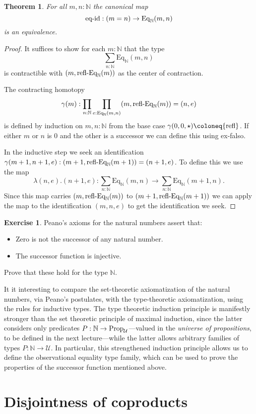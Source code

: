 \documentclass{amsart}
\theoremstyle{theorem}
\newtheorem*{thm}{Theorem}
\theoremstyle{definition}
\newtheorem*{exc}{Exercise}
\theoremstyle{remark}
\newcommand{\0}{\mathbbe{0}}
\newcommand{\1}{\mathbbe{1}}
\newcommand{\2}{\mathbbe{2}}
\newcommand{\3}{\mathbbe{3}}
\newcommand{\4}{\mathbbe{4}}
\newcommand{\term}[1]{{\textup{#1}}}
\newcommand{\type}[1]{{\textup{#1}}}
\newcommand{\bN}{{\mathbb{N}}}
\newcommand{\refl}{\term{refl}}
\newcommand{\UU}{{\mathcal{U}}}
\newcommand{\Eq}{\mathrm{Eq}}
\newcommand{\Prop}{\type{Prop}_{\UU}}
\begin{document}
\begin{thm} For all $m,n : \bN$ the canonical map
\[ \term{eq-id} : (m=n) \to \Eq_\bN(m,n)\] is an equivalence.
\end{thm}
\begin{proof}
It suffices to show for each $m : \bN$ that the type \[ \sum_{n : \bN} \Eq_\bN(m,n)\] is contractible with $(m,\term{refl-Eq}_\bN(m))$ as the center of contraction.

The contracting homotopy
\[ \gamma(m) : \prod_{n :\bN} \prod_{e :\Eq_\bN(m,n)} (m,\term{refl-Eq}_\bN(m)) = (n,e)\]
is defined by induction on $m,n : \bN$ from the base case $\gamma(0,0, \star) \coloneq \refl$. If either $m$ or $n$ is 0 and the other is a successor we can define this using ex-falso.

In the inductive step we seek an identification $\gamma(m+1,n+1,e) : (m+1, \term{refl-Eq}_\bN(m+1)) = (n+1,e)$. To define this we use the map
\[ \lambda(n,e).(n+1,e) : \sum_{n:\bN}\Eq_\bN(m,n) \to \sum_{n : \bN}\Eq_\bN(m+1,n).\]
Since this map carries $(m,\term{refl-Eq}_\bN(m))$ to $(m+1,\term{refl-Eq}_\bN(m+1))$ we can apply the map to the identification $(m,n,e)$ to get the identification we seek.
\end{proof}

\begin{exc} Peano's axioms for the natural numbers assert that:
\begin{itemize}
\item Zero is not the successor of any natural number.
\item The successor function is injective.
\end{itemize}
Prove that these hold for the type $\bN$.
\end{exc}

It it interesting to compare the set-theoretic axiomatization of the natural numbers, via Peano's postulates, with the type-theoretic axiomatization, using the rules for inductive types. The type theoretic induction principle is manifestly stronger than the set theoretic principle of maximal induction, since the latter considers only predicates $P : \bN \to \Prop$---valued in the \emph{universe of propositions}, to be defined in the next lecture---while the latter allows arbitrary families of types $P \colon \bN \to \UU$. In particular, this strengthened induction principle allows us to define the observational equality type family, which can be used to prove the properties of the successor function mentioned above.

\section*{Disjointness of coproducts}
\end{document}
